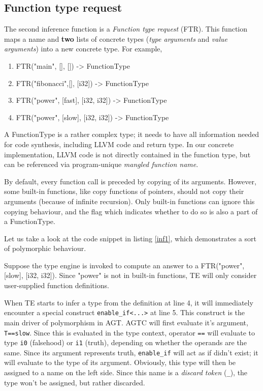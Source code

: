 \documentclass[times, utf8, diplomski]{fer}
\theoremstyle{definition}
\newcommand{\textcode}[3]{
    
}
\begin{document}
\subsection{Function type request}

The second inference function is a \textit{Function type request} (FTR). This function maps
a name and \textbf{two} lists of concrete types (\textit{type arguments} and \textit{value arguments}) 
into a new concrete type. For example,

\begin{enumerate}
    \item FTR("main", [], []) -> FunctionType
    \item FTR("fibonacci",[], [i32]) -> FunctionType
    \item FTR("power", [fast], [i32, i32]) -> FunctionType
    \item FTR("power", [slow], [i32, i32]) -> FunctionType
\end{enumerate}

A FunctionType is a rather complex type; it needs to have all information needed for code synthesis, 
including LLVM code and return type. In our concrete implementation, LLVM code is not directly
contained in the function type, but can be referenced via program-unique \textit{mangled function name}.

By default, every function call is preceded by copying of its arguments. However, some built-in functions,
like copy functions of pointers, should not copy their arguments (because of infinite recursion).
Only built-in functions can ignore this copying behaviour, and the flag which indicates
whether to do so is also a part of a FunctionType.

Let us take a look at the code snippet in listing \ref{inf1}, 
which demonstrates a sort of polymorphic behaviour.

\textcode{\resdir/compiler/inf1.agt}{inf1}{enable\_if example}

Suppose the type engine is invoked to compute an answer to a FTR("power", [slow], [i32, i32]).
Since "power" is not in built-in functions, TE will only consider user-supplied function definitions.

When TE starts to infer a type from the definition at line 4, it will immediately encounter a special
construct \texttt{enable\_if<...>} at line 5. This construct is the main driver of polymorphism in AGT.
AGTC will first evaluate it's argument, \texttt{T==slow}. Since this is evaluated in the type context,
operator \texttt{==} will evaluate to type \texttt{i0} (falsehood) or \texttt{i1} (truth), depending on 
whether the operands are the same.
Since its argument represents truth, \texttt{enable\_if} will act as if didn't exist;
it will evaluate to the type of its argument.
Obviously, this type will then be assigned to a name on the left side. 
Since this name is a \textit{discard token}
(\texttt{\_}), the type won't be assigned, but rather discarded.
\end{document}
